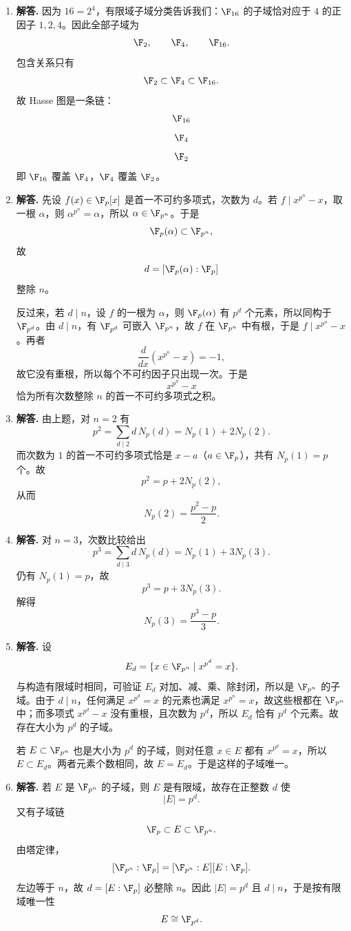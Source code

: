 \begin{enumerate}[label=\textbf{\arabic*.}, leftmargin=*, itemsep=1em]
\item \textbf{解答.} 因为 $16=2^4$，有限域子域分类告诉我们：$\F_{16}$ 的子域恰对应于 $4$ 的正因子 $1,2,4$。因此全部子域为
\[
\F_2,\qquad \F_4,\qquad \F_{16}.
\]
包含关系只有
\[
\F_2\subset \F_4\subset \F_{16}.
\]
故 Hasse 图是一条链：
\[
\F_{16}
\]
\[
\F_4
\]
\[
\F_2
\]
即 $\F_{16}$ 覆盖 $\F_4$，$\F_4$ 覆盖 $\F_2$。

\item \textbf{解答.} 先设 $f(x)\in\F_p[x]$ 是首一不可约多项式，次数为 $d$。若 $f\mid x^{p^n}-x$，取一根 $\alpha$，则 $\alpha^{p^n}=\alpha$，所以 $\alpha\in\F_{p^n}$。于是
\[
\F_p(\alpha)\subset \F_{p^n},
\]
故
\[
d=[\F_p(\alpha):\F_p]
\]
整除 $n$。

反过来，若 $d\mid n$，设 $f$ 的一根为 $\alpha$，则 $\F_p(\alpha)$ 有 $p^d$ 个元素，所以同构于 $\F_{p^d}$。由 $d\mid n$，有 $\F_{p^d}$ 可嵌入 $\F_{p^n}$，故 $f$ 在 $\F_{p^n}$ 中有根，于是 $f\mid x^{p^n}-x$。再者
\[
\frac{d}{dx}(x^{p^n}-x)=-1,
\]
故它没有重根，所以每个不可约因子只出现一次。于是
\[
x^{p^n}-x
\]
恰为所有次数整除 $n$ 的首一不可约多项式之积。

\item \textbf{解答.} 由上题，对 $n=2$ 有
\[
p^2=\sum_{d\mid2} d\,N_p(d)=N_p(1)+2N_p(2).
\]
而次数为 $1$ 的首一不可约多项式恰是 $x-a$（$a\in\F_p$），共有 $N_p(1)=p$ 个。故
\[
p^2=p+2N_p(2),
\]
从而
\[
N_p(2)=\frac{p^2-p}{2}.
\]

\item \textbf{解答.} 对 $n=3$，次数比较给出
\[
p^3=\sum_{d\mid3} d\,N_p(d)=N_p(1)+3N_p(3).
\]
仍有 $N_p(1)=p$，故
\[
p^3=p+3N_p(3).
\]
解得
\[
N_p(3)=\frac{p^3-p}{3}.
\]

\item \textbf{解答.} 设
\[
E_d=\{x\in\F_{p^n}\mid x^{p^d}=x\}.
\]
与构造有限域时相同，可验证 $E_d$ 对加、减、乘、除封闭，所以是 $\F_{p^n}$ 的子域。由于 $d\mid n$，任何满足 $x^{p^d}=x$ 的元素也满足 $x^{p^n}=x$，故这些根都在 $\F_{p^n}$ 中；而多项式 $x^{p^d}-x$ 没有重根，且次数为 $p^d$，所以 $E_d$ 恰有 $p^d$ 个元素。故存在大小为 $p^d$ 的子域。

若 $E\subset\F_{p^n}$ 也是大小为 $p^d$ 的子域，则对任意 $x\in E$ 都有 $x^{p^d}=x$，所以 $E\subset E_d$。两者元素个数相同，故 $E=E_d$。于是这样的子域唯一。

\item \textbf{解答.} 若 $E$ 是 $\F_{p^n}$ 的子域，则 $E$ 是有限域，故存在正整数 $d$ 使
\[
|E|=p^d.
\]
又有子域链
\[
\F_p\subset E\subset \F_{p^n}.
\]
由塔定律，
\[
[\F_{p^n}:\F_p]=[\F_{p^n}:E][E:\F_p].
\]
左边等于 $n$，故 $d=[E:\F_p]$ 必整除 $n$。因此 $|E|=p^d$ 且 $d\mid n$，于是按有限域唯一性
\[
E\cong \F_{p^d}.
\]


\end{enumerate}
